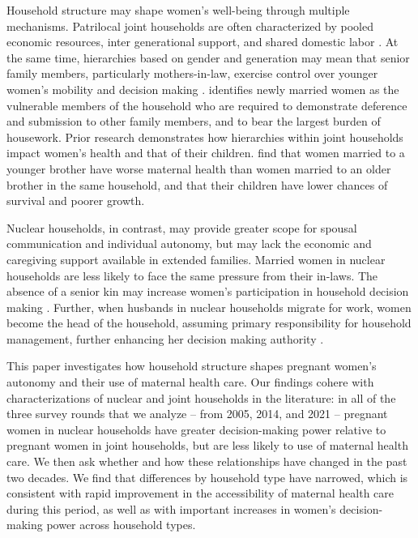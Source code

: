\documentclass[12pt]{article}
\begin{document}
Household structure may shape women’s well-being through multiple mechanisms. Patrilocal joint households are often characterized by pooled economic resources, inter generational support, and shared domestic labor \citep{wadley1988karimpur}.  At the same time, hierarchies based on gender and generation may mean that senior family members, particularly mothers-in-law, exercise control over younger women’s mobility and decision making \citep{desai2005women, bloom2001dimensions}. \cite{gupta1999lifeboat} identifies newly married women as the  vulnerable members of the household who are required to demonstrate deference and submission to other family members, and to bear the largest burden of housework. Prior research demonstrates how hierarchies within joint households impact women’s health and that of their children. \cite{coffey2022mothers} find that women married to a younger brother have worse maternal health than women married to an older brother in the same household, and that their children have lower chances of survival and poorer growth.

Nuclear households, in contrast, may provide greater scope for spousal communication and individual autonomy, but may lack the economic and caregiving support available in extended families. Married women in nuclear households are less likely to face the same pressure from their in-laws. The absence of a senior kin may increase women’s participation in household decision making \citep{simkhada2010role,char2010influence}. Further, when husbands in nuclear households migrate for work, women become the head of the household, assuming primary responsibility for  household management, further enhancing her decision making authority \citep{desai2008negotiated}. 

This paper investigates how household structure shapes pregnant women's autonomy and their use of maternal health care.  Our findings cohere with characterizations of nuclear and joint households in the literature: in all of the three survey rounds that we analyze -- from 2005, 2014, and 2021 -- pregnant women in nuclear households have greater decision-making power relative to pregnant women in joint households, but are less likely to use of maternal health care.  We then ask whether and how these relationships have changed in the past two decades.  We find that differences by household type have narrowed, which is consistent with rapid improvement in the accessibility of maternal health care during this period, as well as with important increases in women's decision-making power across household types.\citep{ram2026investigation, gandhi2022predictors, muralidharan2017cycling, rai2022use} 
\end{document}
